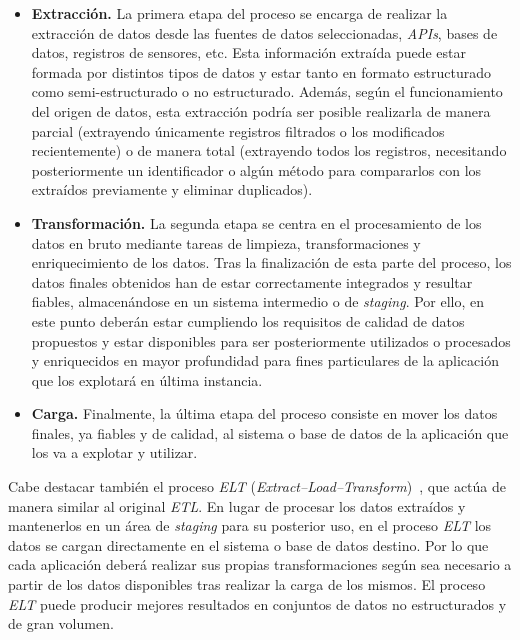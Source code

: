 
\begin{itemize}
    \item \textbf{Extracción.} La primera etapa del proceso se encarga de realizar la extracción de datos desde las fuentes de datos seleccionadas, \textit{APIs}, bases de datos, registros de sensores, etc. Esta información extraída puede estar formada por distintos tipos de datos y estar tanto en formato estructurado como semi-estructurado o no estructurado. Además, según el funcionamiento del origen de datos, esta extracción podría ser posible realizarla de manera parcial (extrayendo únicamente registros filtrados o los modificados recientemente) o de manera total (extrayendo todos los registros, necesitando posteriormente un identificador o algún método para compararlos con los extraídos previamente y eliminar duplicados).

    \item \textbf{Transformación.} La segunda etapa se centra en el procesamiento de los datos en bruto mediante tareas de limpieza, transformaciones y enriquecimiento de los datos. Tras la finalización de esta parte del proceso, los datos finales obtenidos han de estar correctamente integrados y resultar fiables, almacenándose en un sistema intermedio o de \textit{staging}. Por ello, en este punto deberán estar cumpliendo los requisitos de calidad de datos propuestos y estar disponibles para ser posteriormente utilizados o procesados y enriquecidos en mayor profundidad para fines particulares de la aplicación que los explotará en última instancia. 

    \item \textbf{Carga.} Finalmente, la última etapa del proceso consiste en mover los datos finales, ya fiables y de calidad, al sistema o base de datos de la aplicación que los va a explotar y utilizar.
\end{itemize}

Cabe destacar también el proceso \textit{ELT} (\textit{Extract--Load--Transform})~\cite{ibmETL}, que actúa de manera similar al original \textit{ETL}. En lugar de procesar los datos extraídos y mantenerlos en un área de \textit{staging} para su posterior uso, en el proceso \textit{ELT} los datos se cargan directamente en el sistema o base de datos destino. Por lo que cada aplicación deberá realizar sus propias transformaciones según sea necesario a partir de los datos disponibles tras realizar la carga de los mismos. El proceso \textit{ELT} puede producir mejores resultados en conjuntos de datos no estructurados y de gran volumen.  

